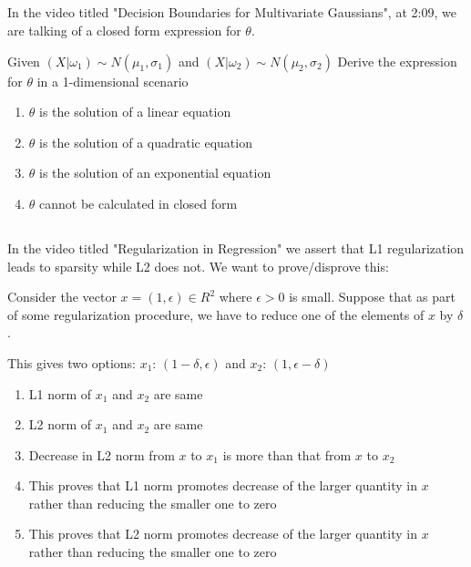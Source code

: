 \begin{frame}
\section{}
In the video titled "Decision Boundaries for Multivariate Gaussians", at 2:09, we are talking of a closed form expression for $\theta$.

Given $(X\vert \omega_1)\sim N(\mu_1,\sigma_1)$ and $(X\vert \omega_2)\sim N(\mu_2,\sigma_2)$ Derive the expression for $\theta$ in a 1-dimensional scenario
\begin{enumerate}
\item $\theta$ is the solution of a linear equation
\item $\theta$ is the solution of a quadratic equation    %
\item $\theta$ is the solution of an exponential equation
\item $\theta$ cannot be calculated in closed form
\end{enumerate}
\end{frame}

\begin{frame}
\section{}
In the video titled "Regularization in Regression" we assert that L1 regularization leads to sparsity while L2 does not. We want to prove/disprove this:

Consider the vector $x = (1,\epsilon)\in R^2$ where $\epsilon>0$ is small. Suppose that as part of some regularization procedure, we have to reduce one of the elements of $x$ by $\delta$.

This gives two options: $x_1$: $(1-\delta,\epsilon)$ and $x_2$: $(1,\epsilon-\delta)$
\begin{enumerate}
\item L1 norm of $x_1$ and $x_2$ are same   %
\item L2 norm of $x_1$ and $x_2$ are same
\item Decrease in L2 norm from $x$ to $x_1$ is more than that from $x$ to $x_2$   %
\item This proves that L1 norm promotes decrease of the larger quantity in $x$ rather than reducing the smaller one to zero
\item This proves that L2 norm promotes decrease of the larger quantity in $x$ rather than reducing the smaller one to zero   %
\end{enumerate}
\end{frame}
